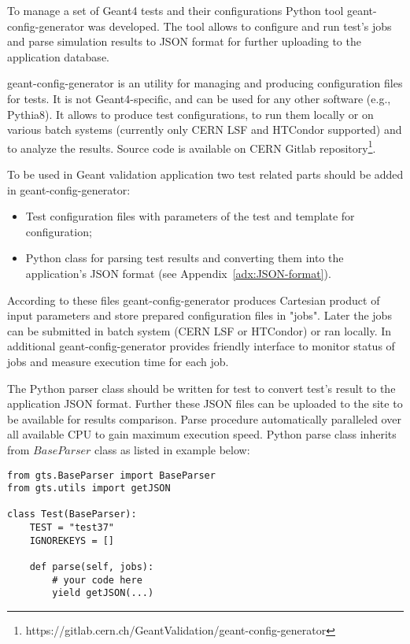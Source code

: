 To manage a set of Geant4 tests and their configurations Python tool geant-config-generator was developed. The tool allows to configure and run test's jobs and parse simulation results to JSON format for further uploading to the application database.

geant-config-generator is an utility for managing and producing configuration files for tests. It is not Geant4-specific, and can be used for any other software (e.g., Pythia8). It allows to produce test configurations, to run them locally or on various batch systems (currently only CERN LSF and HTCondor supported) and to analyze the results. Source code is available on
CERN Gitlab repository\footnote{https://gitlab.cern.ch/GeantValidation/geant-config-generator}.

To be used in Geant validation application two test related parts should be added in geant-config-generator:

\begin{itemize}
	\item Test configuration files with parameters of the test and template for configuration;
	\item Python class for parsing test results and converting them into the application's JSON format (see Appendix~\ref{adx:JSON-format}).
\end{itemize}

According to these files geant-config-generator produces Cartesian product of input parameters and store prepared configuration files in "jobs". Later the jobs can be submitted in batch system (CERN LSF or HTCondor) or ran locally. In additional geant-config-generator provides friendly interface to monitor status of jobs and measure execution time for each job.

The Python parser class should be written for test to convert test's result to the application JSON format. Further these JSON files can be uploaded to the site to be available for results comparison.
Parse procedure automatically paralleled over all available CPU to gain maximum execution speed.
Python parse class inherits from $BaseParser$ class as listed in example below:

\begin{verbatim}
from gts.BaseParser import BaseParser
from gts.utils import getJSON

class Test(BaseParser):
    TEST = "test37"
    IGNOREKEYS = []

    def parse(self, jobs):
        # your code here
        yield getJSON(...)
\end{verbatim}

